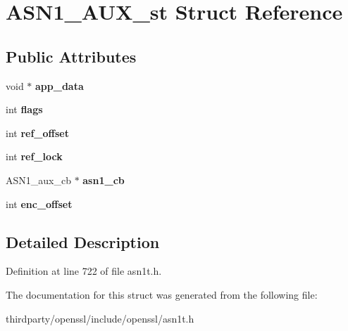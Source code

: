 \hypertarget{struct_a_s_n1___a_u_x__st}{}\section{A\+S\+N1\+\_\+\+A\+U\+X\+\_\+st Struct Reference}
\label{struct_a_s_n1___a_u_x__st}
\subsection*{Public Attributes}
\begin{DoxyCompactItemize}
\item 
\mbox{\label{struct_a_s_n1___a_u_x__st_af83d68015a2f496a759c6973b13a9d97}} 
void $\ast$ {\bfseries app\+\_\+data}
\item 
\mbox{\label{struct_a_s_n1___a_u_x__st_a852e7951bbea693ec9616bac686455c6}} 
int {\bfseries flags}
\item 
\mbox{\label{struct_a_s_n1___a_u_x__st_a7bf75280ea384bfda6f280e97a214f8a}} 
int {\bfseries ref\+\_\+offset}
\item 
\mbox{\label{struct_a_s_n1___a_u_x__st_ab8dd18bd614e4346bae42e2da5046be6}} 
int {\bfseries ref\+\_\+lock}
\item 
\mbox{\label{struct_a_s_n1___a_u_x__st_a1972a608ed6091b6b830839b785b74e8}} 
A\+S\+N1\+\_\+aux\+\_\+cb $\ast$ {\bfseries asn1\+\_\+cb}
\item 
\mbox{\label{struct_a_s_n1___a_u_x__st_a71b62b72c2eff33605ff2e3f4d833c15}} 
int {\bfseries enc\+\_\+offset}
\end{DoxyCompactItemize}


\subsection{Detailed Description}


Definition at line 722 of file asn1t.\+h.



The documentation for this struct was generated from the following file\+:\begin{DoxyCompactItemize}
\item 
thirdparty/openssl/include/openssl/asn1t.\+h\end{DoxyCompactItemize}
